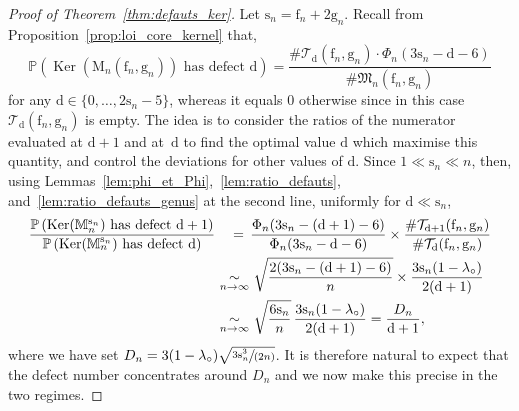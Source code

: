 \documentclass[JEP,XML,SOM,Unicode,NoFloatCountersInSection,NoEqCountersInSection]{cedram}
\theoremstyle{plain}
\theoremstyle{definition}
\theoremstyle{remark}
\renewcommand{\P}{\mathbb{P}}
\newcommand{\Map}{\mathrm{M}}
\newcommand{\Mapb}{\mathbb{M}}
\newcommand{\face}{\mathrm{f}}
\newcommand{\defect}{\mathrm{d}}
\newcommand{\gen}{\mathrm{g}}
\newcommand{\spar}{\mathrm{s}}
\DeclareMathOperator{\Ker}{Ker}
\newcommand{\equi}[1][n]{\,\mathop{\sim}^{}_{#1 \to \infty}\,}
\begin{document}
\begin{proof}[Proof of Theorem~\ref{thm:defauts_ker}]
Let $\spar_n = \face_n+2\gen_n$.
Recall from Proposition~\ref{prop:loi_core_kernel} that,
\[
\P\left(\Ker(\Map_n(\face_n,\gen_n)) \textrm{ has defect } \defect\right)
= \frac{\# \mathcal{T}_\defect(\face_n,\gen_n) \cdot \Phi_{n}(3\spar_n-\defect-6 )}{\# \mathfrak{M}_n(\face_n,\gen_n)}
\]
for any $\defect \in\{0, \dots, 2\spar_n-5\}$, whereas it equals $0$ otherwise since in this case $\mathcal{T}_\defect(\face_n,\gen_n)$ is empty.
The idea is to consider the ratios of the numerator evaluated at $\defect+1$ and at~$\defect$ to find the optimal value $\defect$ which maximise this quantity, and control the deviations for other values of $\defect$.
Since $ 1 \ll \spar_{n} \ll n$, then, using Lemmas~\ref{lem:phi_et_Phi},~\ref{lem:ratio_defauts}, and~\ref{lem:ratio_defauts_genus} at the second line, uniformly for $ \defect \ll \spar_{n}$,
\begin{align}
\frac{\P\left(\Ker(\Mapb_n^{\spar_n}) \textrm{ has defect } \defect+1\right)}{\P\left(\Ker(\Mapb_n^{\spar_n}) \textrm{ has defect } \defect\right)}
&\quad=\, \frac{\Phi_{n}(3\spar_n-(\defect+1)-6 )}{\Phi_{n}(3\spar_n-\defect-6 )} \times \frac{ \# \mathcal{T}_{ \defect +1}(\face_n,\gen_n)}{{ \# \mathcal{T}_{ \defect}(\face_n,\gen_n)}}
\notag\\
&\equi \sqrt{\frac{2(3\spar_n - (\defect+1) - 6)}{n}} \times \frac{3 \spar_n(1-\lambda_{\circ})}{2 (\defect+1)}
\notag\\
&\equi \sqrt{\frac{6\spar_n}{n}}\, \frac{3 \spar_n(1-\lambda_{\circ})}{2 (\defect+1)}
= \frac{D_n}{\defect+1}, \label{eq:ratio_estimee}
\end{align}
where we have set $D_n = 3 (1-\lambda_{\circ}) \sqrt{\sfrac{3\spar_n^3}{(2n)}}$. It is therefore natural to expect that the defect number concentrates around $D_n$ and we now make this precise in the two regimes.


\end{proof}
\end{document}
